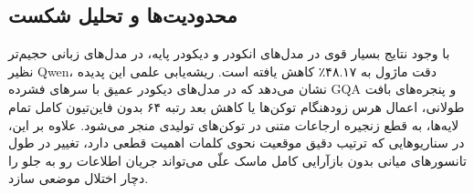 \subsection{محدودیت‌ها و تحلیل شکست}
با وجود نتایج بسیار قوی در مدل‌های انکودر و دیکودر پایه، در مدل‌های زبانی حجیم‌تر نظیر Qwen، دقت ماژول به ۴۸.۱۷٪ کاهش یافته است. ریشه‌یابی علمی این پدیده نشان می‌دهد که در مدل‌های دیکودر عمیق با سرهای فشرده GQA و پنجره‌های بافت طولانی، اعمال هرس زودهنگام توکن‌ها یا کاهش بعد رتبه ۶۴ بدون فاین‌تیون کامل تمام لایه‌ها، به قطع زنجیره ارجاعات متنی در توکن‌های تولیدی منجر می‌شود. علاوه بر این، در سناریوهایی که ترتیب دقیق موقعیت نحوی کلمات اهمیت قطعی دارد، تغییر در طول تانسورهای میانی بدون بازآرایی کامل ماسک علّی می‌تواند جریان اطلاعات رو به جلو را دچار اختلال موضعی سازد.
